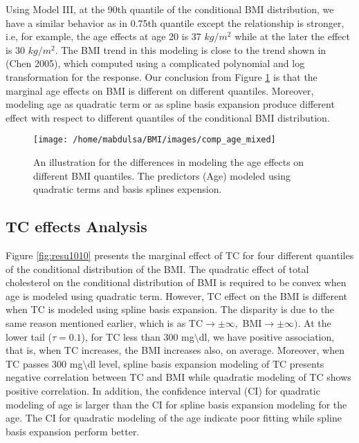 \documentclass[
  12pt,
]{article}
\begin{document}
Using Model III, at the 90th quantile of the conditional BMI distribution, we have a similar behavior as in 0.75th quantile except the relationship is stronger, i.e, for example, the age effects at age 20 is 37 \(kg/m^2\) while at the later the effect is 30 \(kg/m^2\). The BMI trend in this modeling is close to the trend shown in (Chen 2005), which computed using a complicated polynomial and log transformation for the response. Our conclusion from Figure \ref{fig:resu1000} is that the marginal age effects on BMI is different on different quantiles. Moreover, modeling age as quadratic term or as spline basis expansion produce different effect with respect to different quantiles of the conditional BMI distribution.

\begin{figure}

{\centering \texttt{[image: /home/mabdulsa/BMI/images/comp\_age\_mixed]} 

}

\caption{  An illustration for the differences in modeling the age effects on different BMI quantiles. The predictors (Age) modeled using quadratic terms and basis splines expension.}\label{fig:resu1000}
\end{figure}
\subsection{TC effects Analysis}

Figure \ref{fig:resu1010} presents the marginal effect of TC for four different quantiles of the conditional distribution of the BMI.
The quadratic effect of total cholesterol on the conditional distribution of BMI is required to be convex when age is modeled using quadratic term. However, TC effect on the BMI is different when TC is modeled using spline basis expansion. The disparity is due to the same reason mentioned earlier, which is as
TC\(\rightarrow\pm\infty,\) BMI\(\rightarrow \pm\infty).\) At the lower tail (\(\tau=0.1\)), for TC less than 300 mg\(\setminus\)dl, we have positive association, that is, when TC increases, the BMI increases also, on average. Moreover, when TC passes 300 mg\(\setminus\)dl level, spline basis expansion modeling of TC presents negative correlation between TC and BMI while quadratic modeling of TC shows positive correlation. In addition, the confidence interval (CI) for quadratic modeling of age is larger than the CI for spline basis expansion modeling for the age. The CI for quadratic modeling of the age indicate poor fitting while spline basis expansion perform better.
\end{document}
